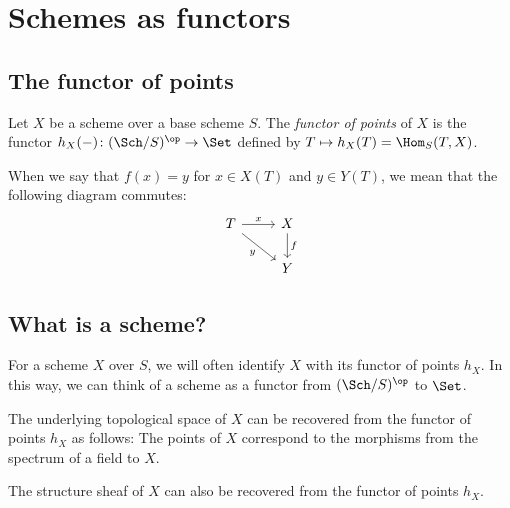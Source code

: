 \section{Schemes as functors}


\subsection{The functor of points}

    Let \(X\) be a scheme over a base scheme \(S\).
    The \emph{functor of points} of \(X\) is the functor \(h_X(-)\colon (\Sch/S)^{\op} \to \Set\) defined by \(T \mapsto h_X(T) = \Hom_S(T, X)\).

    When we say that \(f(x) = y\) for \(x \in X(T)\) and \(y \in Y(T)\), we mean that the following diagram commutes:
    \[\begin{tikzcd}
        T \arrow[r, "x"] \arrow[rd, "y"'] & X \arrow[d, "f"] \\
                                           & Y
    \end{tikzcd}\]

\subsection{What is a scheme?}

    For a scheme \(X\) over \(S\), we will often identify \(X\) with its functor of points \(h_X\).
    In this way, we can think of a scheme as a functor from \((\Sch/S)^{\op}\) to \(\Set\).

    The underlying topological space of \(X\) can be recovered from the functor of points \(h_X\) as follows:
    The points of \(X\) correspond to the morphisms from the spectrum of a field to \(X\).

    The structure sheaf of \(X\) can also be recovered from the functor of points \(h_X\).




